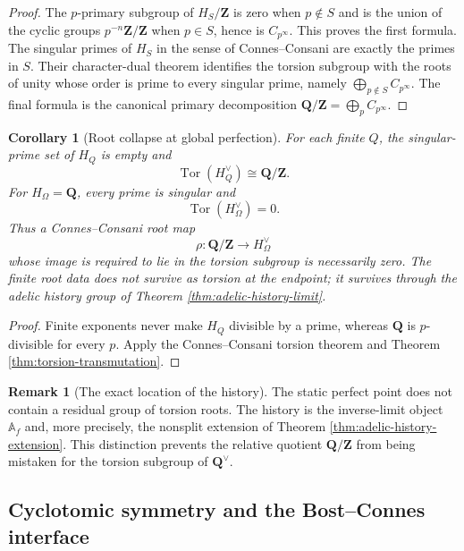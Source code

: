 \documentclass[11pt]{amsart}
\numberwithin{equation}{section}
\newtheorem{corollary}[theorem]{Corollary}
\theoremstyle{definition}
\newtheorem{remark}[theorem]{Remark}
\newcommand{\Z}{\mathbf Z}
\newcommand{\Q}{\mathbf Q}
\newcommand{\Tor}{\operatorname{Tor}}
\begin{document}
\begin{proof}
The $p$-primary subgroup of $H_S/\Z$ is zero when $p\notin S$ and is the
union of the cyclic groups $p^{-n}\Z/\Z$ when $p\in S$, hence is
$C_{p^\infty}$.  This proves the first formula.  The singular primes of
$H_S$ in the sense of Connes--Consani are exactly the primes in $S$.
Their character-dual theorem identifies the torsion subgroup with the
roots of unity whose order is prime to every singular prime, namely
$\bigoplus_{p\notin S}C_{p^\infty}$.  The final formula is the canonical
primary decomposition
$\Q/\Z=\bigoplus_pC_{p^\infty}$.
\end{proof}

\begin{corollary}[Root collapse at global perfection]
\label{cor:root-collapse-global-perfection}
For each finite $Q$, the singular-prime set of $H_Q$ is empty and
\[
\Tor(H_Q^\vee)\cong\Q/\Z.
\]
For $H_\Omega=\Q$, every prime is singular and
\[
\Tor(H_\Omega^\vee)=0.
\]
Thus a Connes--Consani root map
\[
\rho:\Q/\Z\longrightarrow H_\Omega^\vee
\]
whose image is required to lie in the torsion subgroup is necessarily
zero.  The finite root data does not survive as torsion at the endpoint;
it survives through the adelic history group of Theorem
\ref{thm:adelic-history-limit}.
\end{corollary}

\begin{proof}
Finite exponents never make $H_Q$ divisible by a prime, whereas $\Q$ is
$p$-divisible for every $p$.  Apply the Connes--Consani torsion theorem and
Theorem \ref{thm:torsion-transmutation}.
\end{proof}

\begin{remark}[The exact location of the history]
The static perfect point does not contain a residual group of torsion roots.
The history is the inverse-limit object $\mathbb A_f$ and, more precisely,
the nonsplit extension of Theorem \ref{thm:adelic-history-extension}.
This distinction prevents the relative quotient $\Q/\Z$ from being
mistaken for the torsion subgroup of $\Q^\vee$.
\end{remark}

\subsection{Cyclotomic symmetry and the Bost--Connes interface}
\end{document}

